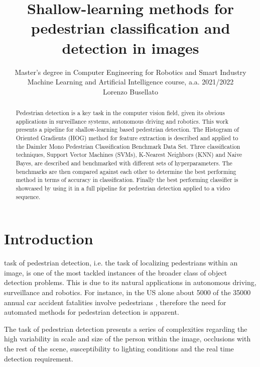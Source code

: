 \documentclass[journal,twocolumn]{IEEEtran}
\begin{document}
\title{Shallow-learning methods for pedestrian classification and detection in images}

\author[1]{Master’s degree in Computer Engineering for Robotics and Smart Industry\\Machine Learning and Artificial Intelligence course, a.a. 2021/2022\\ Lorenzo Busellato}%
\onecolumn

\maketitle
\begin{abstract} Pedestrian detection is a key task in the computer vision field, given its obvious applications in surveillance systems, autonomous driving and robotics. 
This work presents a pipeline for shallow-learning based pedestrian detection. The Histogram of Oriented Gradients (HOG)
method for feature extraction is described and applied to the Daimler Mono Pedestrian Classification Benchmark Data Set. Three classification
techniques, Support Vector Machines (SVMs), K-Nearest Neighbors (KNN) and Naive Bayes, are described and benchmarked
with different sets of hyperparameters. The benchmarks are then compared against each other to determine the best performing
method in terms of accuracy in classification. Finally the best performing classifier is showcased by using it in a full pipeline for pedestrian detection applied to a video sequence.
\end{abstract}
  \tableofcontents
  \listoffigures
  \listoftables  
  \clearpage
  \twocolumn

\IEEEpeerreviewmaketitle

\section{Introduction}
 task of pedestrian detection, i.e. the task of localizing pedestrians within an image, is one of the most tackled
instances of the broader class of object detection problems.
This is due to its natural applications in autonomous driving,
surveillance and robotics. For instance, in the US alone about
5000 of the 35000 annual car accident fatalities involve
pedestrians \cite{1}, therefore the need for automated methods for
pedestrian detection is apparent.

The task of pedestrian detection presents a series of complexities regarding the high variability in scale and size of the
person within the image, occlusions with the rest of the scene,
susceptibility to lighting conditions and the real time detection
requirement.
\end{document}
